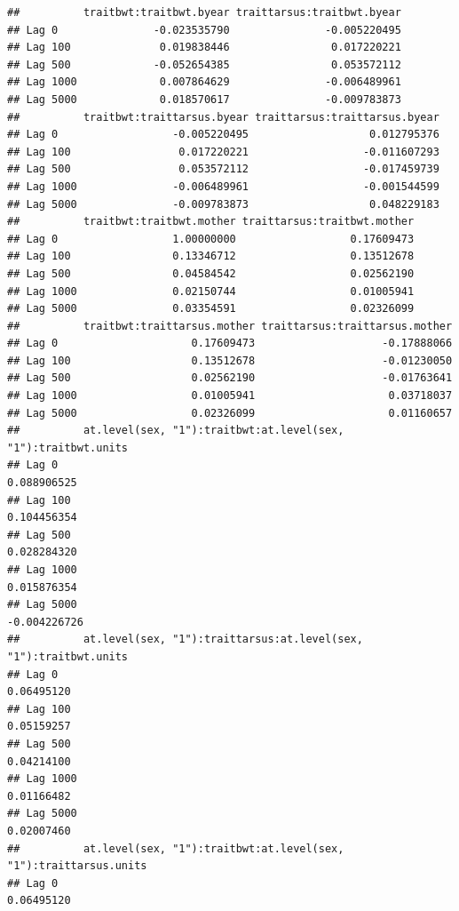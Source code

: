 \documentclass[
  12pt,
]{book}
\begin{document}
\begin{verbatim}
##          traitbwt:traitbwt.byear traittarsus:traitbwt.byear
## Lag 0               -0.023535790               -0.005220495
## Lag 100              0.019838446                0.017220221
## Lag 500             -0.052654385                0.053572112
## Lag 1000             0.007864629               -0.006489961
## Lag 5000             0.018570617               -0.009783873
##          traitbwt:traittarsus.byear traittarsus:traittarsus.byear
## Lag 0                  -0.005220495                   0.012795376
## Lag 100                 0.017220221                  -0.011607293
## Lag 500                 0.053572112                  -0.017459739
## Lag 1000               -0.006489961                  -0.001544599
## Lag 5000               -0.009783873                   0.048229183
##          traitbwt:traitbwt.mother traittarsus:traitbwt.mother
## Lag 0                  1.00000000                  0.17609473
## Lag 100                0.13346712                  0.13512678
## Lag 500                0.04584542                  0.02562190
## Lag 1000               0.02150744                  0.01005941
## Lag 5000               0.03354591                  0.02326099
##          traitbwt:traittarsus.mother traittarsus:traittarsus.mother
## Lag 0                     0.17609473                    -0.17888066
## Lag 100                   0.13512678                    -0.01230050
## Lag 500                   0.02562190                    -0.01763641
## Lag 1000                  0.01005941                     0.03718037
## Lag 5000                  0.02326099                     0.01160657
##          at.level(sex, "1"):traitbwt:at.level(sex, "1"):traitbwt.units
## Lag 0                                                      0.088906525
## Lag 100                                                    0.104456354
## Lag 500                                                    0.028284320
## Lag 1000                                                   0.015876354
## Lag 5000                                                  -0.004226726
##          at.level(sex, "1"):traittarsus:at.level(sex, "1"):traitbwt.units
## Lag 0                                                          0.06495120
## Lag 100                                                        0.05159257
## Lag 500                                                        0.04214100
## Lag 1000                                                       0.01166482
## Lag 5000                                                       0.02007460
##          at.level(sex, "1"):traitbwt:at.level(sex, "1"):traittarsus.units
## Lag 0                                                          0.06495120

\end{verbatim}
\end{document}
